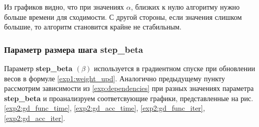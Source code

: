 \documentclass[a4paper, 11pt]{article}
\begin{document}
             Из графиков видно, что при значениях $\alpha$, близких к нулю алгоритму нужно больше времени для сходимости. С другой стороны, если значения слишком большие, то алгоритм становится крайне не стабильным.
            \subsubsection{Параметр размера шага step\_beta}
                Параметр \textbf{step\_beta $(\beta)$} используется в градиентном спуске при обновлении весов в формуле \ref{exp1:weight_upd}.
                Аналогично предыдущему пункту рассмотрим зависимости из \ref{exp:dependencies} при разных значениях параметра \textbf{step\_beta} и проанализруем соответсвующие графики, представленные на рис. \ref{exp2:gd_func_time}, \ref{exp2:gd_acc_time}, \ref{exp2:gd_func_iter}, \ref{exp2:gd_acc_iter}.
                
\end{document}
